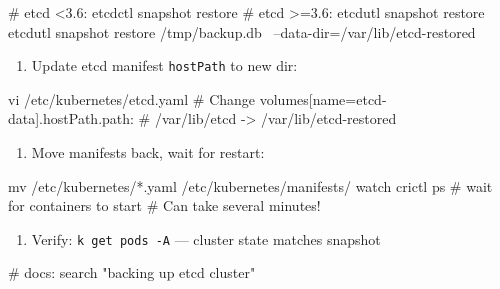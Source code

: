 \begin{tcbitemize}[
  raster columns=3, raster equal height=rows,
  blanker, cheat subtitle
]
\begin{tcbitemize}[
      raster columns=1, raster equal height=rows,
      blanker, cheat subtitle
    ]
{\begin{enumerate}[leftmargin=1.2em, itemsep=0pt, parsep=0pt, topsep=1pt, start=4]
          \end{enumerate}}
          \begin{cheatcodebash}
          # etcd <3.6: etcdctl snapshot restore
          # etcd >=3.6: etcdutl snapshot restore
          etcdutl snapshot restore /tmp/backup.db \
            --data-dir=/var/lib/etcd-restored
          \end{cheatcodebash}
          \vspace{-0.5ex}
          {\fontsize{6.5}{7.5}\selectfont\sffamily
          \begin{enumerate}[leftmargin=1.2em, itemsep=0pt, parsep=0pt, topsep=1pt, start=5]
            \item Update etcd manifest \texttt{hostPath} to new dir:
          \end{enumerate}}
          \begin{cheatcodebash}
          vi /etc/kubernetes/etcd.yaml
          # Change volumes[name=etcd-data].hostPath.path:
          #   /var/lib/etcd -> /var/lib/etcd-restored
          \end{cheatcodebash}
          \vspace{-0.5ex}
          {\fontsize{6.5}{7.5}\selectfont\sffamily
          \begin{enumerate}[leftmargin=1.2em, itemsep=0pt, parsep=0pt, topsep=1pt, start=6]
            \item Move manifests back, wait for restart:
          \end{enumerate}}
          \begin{cheatcodebash}
          mv /etc/kubernetes/*.yaml /etc/kubernetes/manifests/
          watch crictl ps     # wait for containers to start
          # Can take several minutes!
          \end{cheatcodebash}
          \vspace{-0.5ex}
          {\fontsize{6.5}{7.5}\selectfont\sffamily
          \begin{enumerate}[leftmargin=1.2em, itemsep=0pt, parsep=0pt, topsep=1pt, start=7]
            \item Verify: \texttt{k get pods -A} — cluster state matches snapshot
          \end{enumerate}}
          \begin{cheatcodebash}
          # docs: search "backing up etcd cluster"
          \end{cheatcodebash}


\end{tcbitemize}
\end{tcbitemize}
